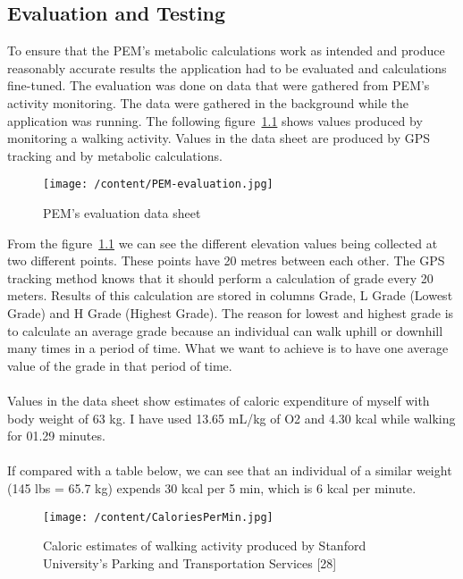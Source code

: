 \documentclass[12pt, a4paper]{report}   %
\begin{document}
\begin{enumerate}
	
\clearpage
\chapter{Evaluation and Testing}
To ensure that the PEM's metabolic calculations work as intended and produce reasonably accurate results the application had to be evaluated and calculations fine-tuned. The evaluation was done on data that were gathered from PEM's activity monitoring. The data were gathered in the background while the application was running. The following figure~\ref{PEM-evaluation} shows values produced by monitoring a walking activity. Values in the data sheet are produced by GPS tracking and by metabolic calculations.\\


\begin{figure}[H]
\begin{sideways}
\begin{minipage}{19cm}
	\texttt{[image: /content/PEM-evaluation.jpg]}
	\caption{PEM's evaluation data sheet}
	\label{PEM-evaluation}
\end{minipage}
\end{sideways}
\centering
\end{figure}


\clearpage
From the figure~\ref{PEM-evaluation} we can see the different elevation values being collected at two different points. These points have 20 metres between each other. The GPS tracking method knows that it should perform a calculation of grade every 20 meters. Results of this calculation are stored in columns Grade, L Grade (Lowest Grade) and H Grade (Highest Grade). The reason for lowest and highest grade is to calculate an average grade because an individual can walk uphill or downhill many times in a period of time. What we want to achieve is to have one average value of the grade in that period of time.\\ \\
Values in the data sheet show estimates of caloric expenditure of myself with body weight of 63 kg. I have used 13.65 mL/kg of O2 and 4.30 kcal while walking for 01.29 minutes.\\ \\
If compared with a table below, we can see that an individual of a similar weight (145 lbs = 65.7 kg) expends 30 kcal per 5 min, which is 6 kcal per minute.\\


\begin{figure}[H]
  \centering
	\texttt{[image: /content/CaloriesPerMin.jpg]}
	  \caption{Caloric estimates of walking activity produced by Stanford University's Parking and Transportation Services [28]}
\end{figure}



\end{enumerate}
\end{document}

